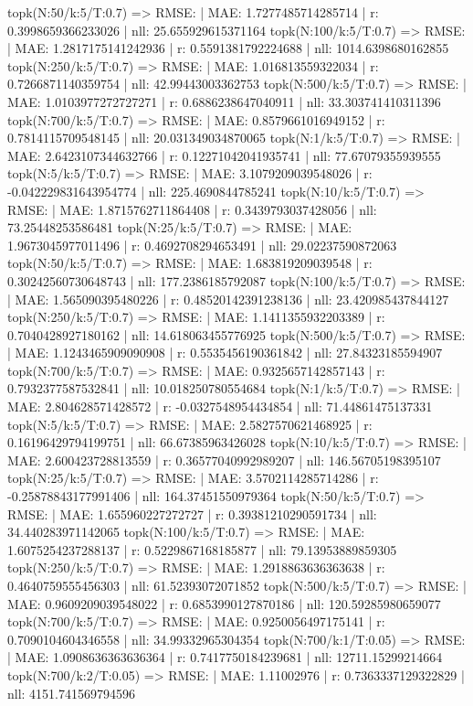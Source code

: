 topk(N:50/k:5/T:0.7) => RMSE: | MAE: 1.7277485714285714 | r: 0.3998659366233026 | nll: 25.655929615371164
topk(N:100/k:5/T:0.7) => RMSE: | MAE: 1.2817175141242936 | r: 0.5591381792224688 | nll: 1014.6398680162855
topk(N:250/k:5/T:0.7) => RMSE: | MAE: 1.016813559322034 | r: 0.7266871140359754 | nll: 42.99443003362753
topk(N:500/k:5/T:0.7) => RMSE: | MAE: 1.0103977272727271 | r: 0.6886238647040911 | nll: 33.303741410311396
topk(N:700/k:5/T:0.7) => RMSE: | MAE: 0.8579661016949152 | r: 0.7814115709548145 | nll: 20.031349034870065
topk(N:1/k:5/T:0.7) => RMSE: | MAE: 2.6423107344632766 | r: 0.12271042041935741 | nll: 77.67079355939555
topk(N:5/k:5/T:0.7) => RMSE: | MAE: 3.1079209039548026 | r: -0.042229831643954774 | nll: 225.4690844785241
topk(N:10/k:5/T:0.7) => RMSE: | MAE: 1.8715762711864408 | r: 0.3439793037428056 | nll: 73.25448253586481
topk(N:25/k:5/T:0.7) => RMSE: | MAE: 1.9673045977011496 | r: 0.4692708294653491 | nll: 29.02237590872063
topk(N:50/k:5/T:0.7) => RMSE: | MAE: 1.683819209039548 | r: 0.30242560730648743 | nll: 177.2386185792087
topk(N:100/k:5/T:0.7) => RMSE: | MAE: 1.565090395480226 | r: 0.48520142391238136 | nll: 23.420985437844127
topk(N:250/k:5/T:0.7) => RMSE: | MAE: 1.1411355932203389 | r: 0.7040428927180162 | nll: 14.618063455776925
topk(N:500/k:5/T:0.7) => RMSE: | MAE: 1.1243465909090908 | r: 0.5535456190361842 | nll: 27.84323185594907
topk(N:700/k:5/T:0.7) => RMSE: | MAE: 0.9325657142857143 | r: 0.7932377587532841 | nll: 10.018250780554684
topk(N:1/k:5/T:0.7) => RMSE: | MAE: 2.804628571428572 | r: -0.0327548954434854 | nll: 71.44861475137331
topk(N:5/k:5/T:0.7) => RMSE: | MAE: 2.5827570621468925 | r: 0.16196429794199751 | nll: 66.67385963426028
topk(N:10/k:5/T:0.7) => RMSE: | MAE: 2.600423728813559 | r: 0.36577040992989207 | nll: 146.56705198395107
topk(N:25/k:5/T:0.7) => RMSE: | MAE: 3.5702114285714286 | r: -0.25878843177991406 | nll: 164.37451550979364
topk(N:50/k:5/T:0.7) => RMSE: | MAE: 1.655960227272727 | r: 0.39381210290591734 | nll: 34.440283971142065
topk(N:100/k:5/T:0.7) => RMSE: | MAE: 1.6075254237288137 | r: 0.5229867168185877 | nll: 79.13953889859305
topk(N:250/k:5/T:0.7) => RMSE: | MAE: 1.2918863636363638 | r: 0.4640759555456303 | nll: 61.52393072071852
topk(N:500/k:5/T:0.7) => RMSE: | MAE: 0.9609209039548022 | r: 0.6853990127870186 | nll: 120.59285980659077
topk(N:700/k:5/T:0.7) => RMSE: | MAE: 0.9250056497175141 | r: 0.7090104604346558 | nll: 34.99332965304354
topk(N:700/k:1/T:0.05) => RMSE: | MAE: 1.0908636363636364 | r: 0.7417750184239681 | nll: 12711.15299214664
topk(N:700/k:2/T:0.05) => RMSE: | MAE: 1.11002976 | r: 0.7363337129322829 | nll: 4151.741569794596
